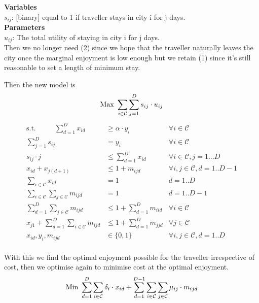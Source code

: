 \documentclass[12pt]{article}
\begin{document}
\textbf{Variables}\\
$s_{ij}$: [binary] equal to 1 if traveller stays in city i for j days.\\

\textbf{Parameters} \\
$u_{ij}$: The total utility of staying in city i for j days.\\

Then we no longer need (2) since we hope that the traveller naturally leaves the city once the marginal enjoyment is low enough but we retain (1) since it's still reasonable to set a length of minimum stay.

Then the new model is 
\begin{equation*}
\text{Max } \sum_{i \in \mathcal{C}} \sum_{j=1}^{D} s_{ij} \cdot u_{ij}\\
\end{equation*}
\begin{align}
\text{s.t.~~~~~~~~}
\sum_{d=1}^{D} x_{id} & \geq \alpha \cdot y_{i} & \forall i \in \mathcal{C}\\
\sum_{j=1}^{D} s_{ij} &= y_{i} & \forall i \in \mathcal{C}\\
s_{ij} \cdot j &\leq \sum_{d=1}^{D} x_{id} & \forall i \in \mathcal{C}, j=1...D\\
x_{id} + x_{j(d+1)} & \leq 1 + m_{ijd} & \forall i,j \in \mathcal{C}, d = 1..D-1 \\
\sum_{i \in \mathcal{C}} x_{id} &= 1 & d = 1..D \\
\sum_{i \in \mathcal{C}} \sum_{j \in \mathcal{C}} m_{ijd} &= 1 & d = 1..D-1 \\
\sum_{d=1}^{D} \sum_{j \in \mathcal{C}} m_{ijd} &\leq 1 + \sum_{d=1}^{D} m_{iid} & \forall i \in \mathcal{C} \\
x_{j1} + \sum_{d=1}^{D} \sum_{i \in \mathcal{C}} m_{ijd} &\leq 1 + \sum_{d=1}^{D} m_{jjd} & \forall j \in \mathcal{C}\\
x_{id}, y_{i}, m_{ijd} & \in \{0,1\} & \forall i, j \in \mathcal{C}, d = 1..D
\end{align}\\
With this we find the optimal enjoyment possible for the traveller irrespective of cost, then we optimise again to minimise cost at the optimal enjoyment.
\begin{equation*}
\text{Min } \sum_{d=1}^{D} \sum_{i \in \mathcal{C}} \delta_{i} \cdot x_{id} + \sum_{d=1}^{D-1} \sum_{i \in \mathcal{C}} \sum_{j \in \mathcal{C}} \mu_{ij} \cdot m_{ijd}\\
\end{equation*}
\end{document}
